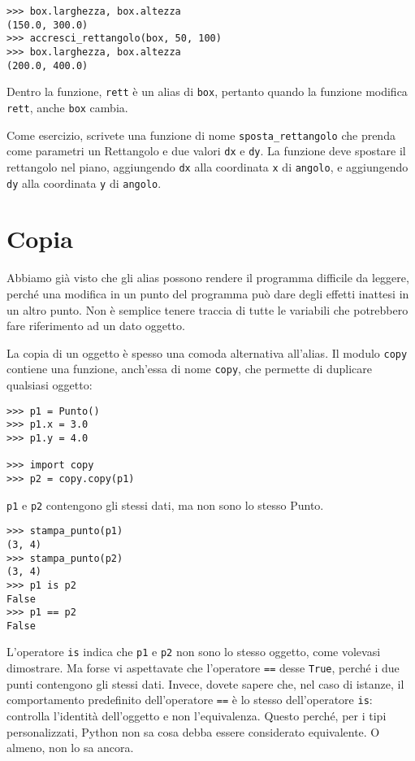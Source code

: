 \documentclass[10pt]{book}
\begin{document}
\begin{verbatim}
>>> box.larghezza, box.altezza
(150.0, 300.0)
>>> accresci_rettangolo(box, 50, 100)
>>> box.larghezza, box.altezza
(200.0, 400.0)
\end{verbatim}
%
Dentro la funzione, {\tt rett} è un alias di {\tt box}, pertanto quando la funzione modifica {\tt rett}, anche {\tt box} cambia.

Come esercizio, scrivete una funzione di nome \verb"sposta_rettangolo" che prenda come parametri un Rettangolo e due valori {\tt dx} e {\tt dy}.  La funzione deve spostare il rettangolo nel piano, aggiungendo {\tt dx} alla coordinata {\tt x} di {\tt angolo}, e aggiungendo {\tt dy} alla coordinata {\tt y} di {\tt angolo}.



\section{Copia}
\label{copying}

Abbiamo già visto che gli alias possono rendere il programma difficile
   da leggere, perché una modifica in un punto del programma può dare degli effetti inattesi in un altro punto. Non è semplice tenere traccia di tutte le variabili che potrebbero fare riferimento ad un dato oggetto.

La copia di un oggetto è spesso una comoda alternativa all'alias.
Il modulo {\tt copy} contiene una funzione, anch'essa di nome {\tt copy}, che permette di duplicare qualsiasi oggetto:

\begin{verbatim}
>>> p1 = Punto()
>>> p1.x = 3.0
>>> p1.y = 4.0

>>> import copy
>>> p2 = copy.copy(p1)
\end{verbatim}
%
{\tt p1} e {\tt p2} contengono gli stessi dati, ma non sono lo stesso Punto.

\begin{verbatim}
>>> stampa_punto(p1)
(3, 4)
>>> stampa_punto(p2)
(3, 4)
>>> p1 is p2
False
>>> p1 == p2
False
\end{verbatim}
%
L'operatore {\tt is} indica che {\tt p1} e {\tt p2} non sono lo stesso oggetto, come volevasi dimostrare. Ma forse vi aspettavate che l'operatore {\tt ==} desse {\tt True}, perché i due punti contengono gli stessi dati. Invece, dovete sapere che, nel caso di istanze, il comportamento predefinito dell'operatore {\tt ==} è lo stesso dell'operatore {\tt is}: controlla l'identità dell'oggetto e non l'equivalenza. Questo perché, per i tipi personalizzati, Python non sa cosa debba essere considerato equivalente. O almeno, non lo sa ancora.
\end{document}
